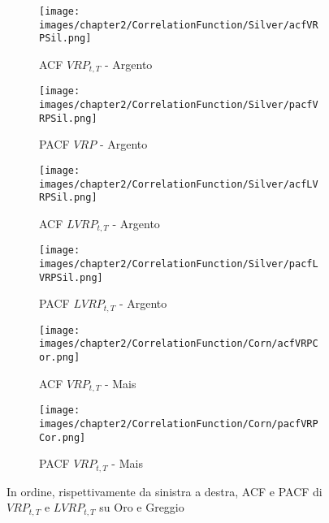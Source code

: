 \clearpage

\begin{figure}[t!]
\begin{subfigure}{0.49\textwidth}
\texttt{[image: images/chapter2/CorrelationFunction/Silver/acfVRPSil.png]}
\caption{ACF $VRP_{t,T}$ - Argento} 
\end{subfigure}\hspace*{\fill}
\begin{subfigure}{0.49\textwidth}
\texttt{[image: images/chapter2/CorrelationFunction/Silver/pacfVRPSil.png]}
\caption{PACF $VRP$ - Argento} 
\end{subfigure}

\vspace{0.35cm}

\begin{subfigure}{0.49\textwidth}
\texttt{[image: images/chapter2/CorrelationFunction/Silver/acfLVRPSil.png]}
\caption{ACF $LVRP_{t,T}$ - Argento} 
\end{subfigure}\hspace*{\fill}
\begin{subfigure}{0.49\textwidth}
\texttt{[image: images/chapter2/CorrelationFunction/Silver/pacfLVRPSil.png]}
\caption{PACF $LVRP_{t,T}$ - Argento} 
\end{subfigure}

\vspace{0.35cm}

\begin{subfigure}{0.49\textwidth}
\texttt{[image: images/chapter2/CorrelationFunction/Corn/acfVRPCor.png]}
\caption{ACF $VRP_{t,T}$ - Mais} 
\end{subfigure}\hspace*{\fill}
\begin{subfigure}{0.49\textwidth}
\texttt{[image: images/chapter2/CorrelationFunction/Corn/pacfVRPCor.png]}
\caption{PACF $VRP_{t,T}$ - Mais} 
\end{subfigure}

\vspace{0.35cm}

\caption{In ordine, rispettivamente da sinistra a destra, ACF e PACF di $VRP_{t,T}$ e $LVRP_{t,T}$ su Oro e Greggio} 
\end{figure}